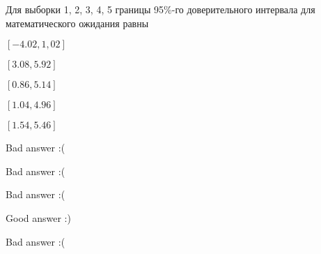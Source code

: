 
\begin{question}
Для выборки 1, 2, 3, 4, 5 границы 95\%-го доверительного интервала для
математического ожидания равны
\begin{answerlist}
  \item \([-4.02, 1,02]\)
  \item \([3.08, 5.92]\)
  \item \([0.86, 5.14]\)
  \item \([1.04, 4.96]\)
  \item \([1.54, 5.46]\)
\end{answerlist}
\end{question}

\begin{solution}
\begin{answerlist}
  \item Bad answer :(
  \item Bad answer :(
  \item Bad answer :(
  \item Good answer :)
  \item Bad answer :(
\end{answerlist}
\end{solution}


